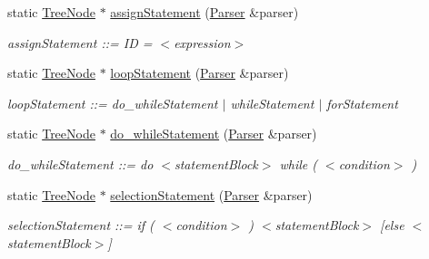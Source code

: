 \begin{DoxyCompactItemize}
\hypertarget{class_rec_des_parser_a4b0ade1ab15495966a47a3445f3dc1da}{}\label{class_rec_des_parser_a4b0ade1ab15495966a47a3445f3dc1da} 
static \hyperlink{class_tree_node}{Tree\+Node} $\ast$ \hyperlink{class_rec_des_parser_a4b0ade1ab15495966a47a3445f3dc1da}{assign\+Statement} (\hyperlink{class_parser}{Parser} \&parser)
\begin{DoxyCompactList}\small\item\em assign\+Statement \+:\+:= ID \textquotesingle{}=\textquotesingle{} $<$expression$>$ \end{DoxyCompactList}\item 
\hypertarget{class_rec_des_parser_a80ce4d5f25df9d6a9311c0f3cf4b7593}{}\label{class_rec_des_parser_a80ce4d5f25df9d6a9311c0f3cf4b7593} 
static \hyperlink{class_tree_node}{Tree\+Node} $\ast$ \hyperlink{class_rec_des_parser_a80ce4d5f25df9d6a9311c0f3cf4b7593}{loop\+Statement} (\hyperlink{class_parser}{Parser} \&parser)
\begin{DoxyCompactList}\small\item\em loop\+Statement \+:\+:= do\+\_\+while\+Statement $\vert$ while\+Statement $\vert$ for\+Statement \end{DoxyCompactList}\item 
\hypertarget{class_rec_des_parser_aaccf88eb7d3084be18cbf16dc6ea10ec}{}\label{class_rec_des_parser_aaccf88eb7d3084be18cbf16dc6ea10ec} 
static \hyperlink{class_tree_node}{Tree\+Node} $\ast$ \hyperlink{class_rec_des_parser_aaccf88eb7d3084be18cbf16dc6ea10ec}{do\+\_\+while\+Statement} (\hyperlink{class_parser}{Parser} \&parser)
\begin{DoxyCompactList}\small\item\em do\+\_\+while\+Statement \+:\+:= do $<$statement\+Block$>$ while ( $<$condition$>$ ) \end{DoxyCompactList}\item 
\hypertarget{class_rec_des_parser_a76b1e2d48e0ffebb6191ad7d57ec5578}{}\label{class_rec_des_parser_a76b1e2d48e0ffebb6191ad7d57ec5578} 
static \hyperlink{class_tree_node}{Tree\+Node} $\ast$ \hyperlink{class_rec_des_parser_a76b1e2d48e0ffebb6191ad7d57ec5578}{selection\+Statement} (\hyperlink{class_parser}{Parser} \&parser)
\begin{DoxyCompactList}\small\item\em selection\+Statement \+:\+:= if ( $<$condition$>$ ) $<$statement\+Block$>$ \mbox{[}else $<$statement\+Block$>$\mbox{]} \end{DoxyCompactList}\item 
\hypertarget{class_rec_des_parser_a22fc9fb779b81433963a29055c0c26b4}{}\label{class_rec_des_parser_a22fc9fb779b81433963a29055c0c26b4} 

\end{DoxyCompactItemize}
